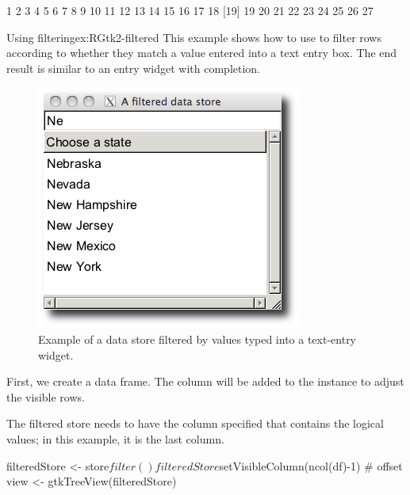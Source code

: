 \begin{Schunk}
\begin{Soutput}
 [1]  1  2  3  4  5  6  7  8  9 10 11 12 13 14 15 16 17 18
[19] 19 20 21 22 23 24 25 26 27
\end{Soutput}
\end{Schunk}



\begin{example}{Using filtering}{ex:RGtk2-filtered}
This example shows how to use  to filter
rows according to whether they match a value entered into a text entry
box. The end result is similar to an entry widget with completion.


\begin{figure}
  \centering
  \includegraphics[width=.45\textwidth]{ex-RGtk2-filtered}
  \caption{Example of a data store filtered by values typed into a
    text-entry widget.}
  \label{fig:RGtk2-filtered}
\end{figure}

First, we create a data frame. The
 column will be added to the 
instance to adjust the visible rows.
\begin{Schunk}
\end{Schunk}

The filtered store needs to have the column specified that contains
the logical values; in this example, it is the last column.
\begin{Schunk}
\begin{Sinput}
 filteredStore <- store$filter()
 filteredStore$setVisibleColumn(ncol(df)-1)      # offset
 view <- gtkTreeView(filteredStore)
\end{Sinput}
\end{Schunk}


\end{example}
